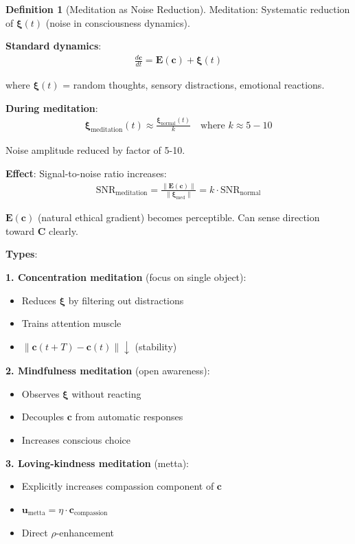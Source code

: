 \documentclass[11pt,a4paper]{article}
\theoremstyle{definition}
\newtheorem{definition}{Definition}[section]
\theoremstyle{remark}
\newcommand{\EE}{\mathbf{E}}
\newcommand{\cc}{\mathbf{c}}
\begin{document}
\begin{small}
\begin{enumerate}
\begin{protocol}
\begin{definition}[Meditation as Noise Reduction]
Meditation: Systematic reduction of \(\boldsymbol{\xi}(t)\) (noise in consciousness dynamics).

\textbf{Standard dynamics}:
\begin{align}
\frac{d\cc}{dt} = \EE(\cc) + \boldsymbol{\xi}(t)
\end{align}

where \(\boldsymbol{\xi}(t)\) = random thoughts, sensory distractions, emotional reactions.

\textbf{During meditation}:
\begin{align}
\boldsymbol{\xi}_{\text{meditation}}(t) \approx \frac{\boldsymbol{\xi}_{\text{normal}}(t)}{k} \quad \text{where } k \approx 5-10
\end{align}

Noise amplitude reduced by factor of 5-10.

\textbf{Effect}: Signal-to-noise ratio increases:
\begin{align}
\text{SNR}_{\text{meditation}} = \frac{\|\EE(\cc)\|}{\|\boldsymbol{\xi}_{\text{med}}\|} = k \cdot \text{SNR}_{\text{normal}}
\end{align}

\(\EE(\cc)\) (natural ethical gradient) becomes perceptible. Can sense direction toward \(\mathbf{C}\) clearly.

\textbf{Types}:

\textbf{1. Concentration meditation} (focus on single object):
\begin{itemize}
    \item Reduces \(\boldsymbol{\xi}\) by filtering out distractions
    \item Trains attention muscle
    \item \(\|\cc(t+T) - \cc(t)\| \downarrow\) (stability)
\end{itemize}

\textbf{2. Mindfulness meditation} (open awareness):
\begin{itemize}
    \item Observes \(\boldsymbol{\xi}\) without reacting
    \item Decouples \(\cc\) from automatic responses
    \item Increases conscious choice
\end{itemize}

\textbf{3. Loving-kindness meditation} (metta):
\begin{itemize}
    \item Explicitly increases compassion component of \(\cc\)
    \item \(\mathbf{u}_{\text{metta}} = \eta \cdot \mathbf{c}_{\text{compassion}}\)
    \item Direct \(\rho\)-enhancement
\end{itemize}
\end{definition}


\end{protocol}
\end{enumerate}
\end{small}
\end{document}
